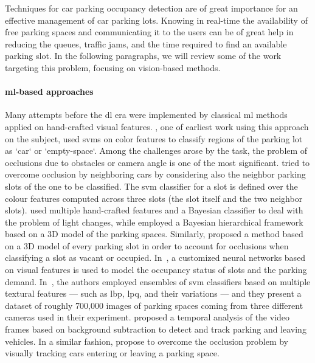 Techniques for car parking occupancy detection are of great importance for an effective management of car parking lots.
Knowing in real-time the availability of free parking spaces and communicating it to the users can be of great help in reducing the queues, traffic jams, and the time required to find an available parking slot.
In the following paragraphs, we will review some of the work targeting this problem, focusing on vision-based methods.

\paragraph{\gls{ml}-based approaches}
Many attempts before the \gls{dl} era were implemented by classical \gls{ml} methods applied on hand-crafted visual features.
\citet{dan2002parking}, one of earliest work using this approach on the subject, used \glspl{svm} on color features to classify regions of the parking lot as `car` or `empty-space`.
Among the challenges arose by the task, the problem of occlusions due to obstacles or camera angle is one of the most significant.
\citet{wu2007robust} tried to overcome occlusion by neighboring cars by considering also the neighbor parking slots of the one to be classified.
The \gls{svm} classifier for a slot is defined over the colour features computed across three slots (the slot itself and the two neighbor slots).
\citet{tsai2007vehicle} used multiple hand-crafted features and a Bayesian classifier to deal with the problem of light changes, while
\citet{huang2013vacant} employed a Bayesian hierarchical framework based on a 3D model of the parking spaces.
Similarly, \citet{delibaltov2013parking} proposed a method based on a 3D model of every parking slot in order to account for occlusions when classifying a slot as vacant or occupied.
In~\cite{jermsurawong2014one}, a customized neural networks based on visual features is used to model the occupancy status of slots and the parking demand. %
In~\cite{de2015pklot}, the authors employed ensembles of \gls{svm} classifiers based on multiple textural features --- such as \gls{lbp}, \gls{lpq}, and their variations --- and they present a dataset of roughly 700,000 images of parking spaces coming from three different cameras used in their experiment.
\citet{del2015vacant} proposed a temporal analysis of the video frames based on background subtraction to detect and track parking and leaving vehicles.
In a similar fashion, \citet{masmoudi2014} propose to overcome the occlusion problem by visually tracking cars entering or leaving a parking space.

